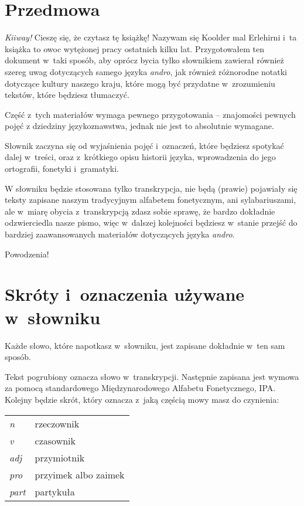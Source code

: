 \newpage

\section{Przedmowa}

\begin{spacing}{1.1}

\emph{Kiiway!} Cieszę się, że czytasz tę książkę! Nazywam się Koolder mal
Erlehirni i~ta książka to owoc wytężonej pracy ostatnich kilku lat.
Przygotowałem ten dokument w~taki sposób, aby oprócz bycia tylko słownikiem
zawierał również szereg uwag dotyczących samego języka \emph{andro}, jak
również różnorodne notatki dotyczące kultury naszego kraju, które mogą być
przydatne w~zrozumieniu tekstów, które będziesz tłumaczyć.

Część z~tych materiałów wymaga pewnego przygotowania -- znajomości pewnych pojęć
z dziedziny językoznawstwa, jednak nie jest to absolutnie wymagane.

Słownik zaczyna się od wyjaśnienia pojęć i~oznaczeń, które będziesz spotykać
dalej w~treści, oraz z~krótkiego opisu historii języka, wprowadzenia do jego
ortografii, fonetyki i~gramatyki.

W słowniku będzie stosowana tylko transkrypcja, nie będą (prawie) pojawiały się
teksty zapisane naszym tradycyjnym alfabetem fonetycznym, ani sylabariuszami,
ale w~miarę obycia z~transkrypcją zdasz sobie sprawę, że bardzo dokładnie
odzwierciedla nasze pismo, więc w~dalszej kolejności będziesz w~stanie przejść
do bardziej zaawansowanych materiałów dotyczących języka \emph{andro}.

\bigskip

Powodzenia!

\section[Skróty i~oznaczenia]{Skróty i~oznaczenia używane w~słowniku}

Każde słowo, które napotkasz w~słowniku, jest zapisane dokładnie w~ten sam
sposób.

Tekst pogrubiony oznacza słowo w~transkrypcji. Następnie zapisana jest wymowa za
pomocą standardowego Międzynarodowego Alfabetu Fonetycznego, IPA. Kolejny będzie
skrót, który oznacza z~jaką częścią mowy masz do czynienia:

\begin{table}[h]
\begin{tabular}{ll}
\emph{n}    & rzeczownik           \\
\emph{v}    & czasownik            \\
\emph{adj}  & przymiotnik          \\
\emph{pro}  & przyimek albo zaimek \\
\emph{part} & partykuła           
\end{tabular}
\end{table}


\end{spacing}

